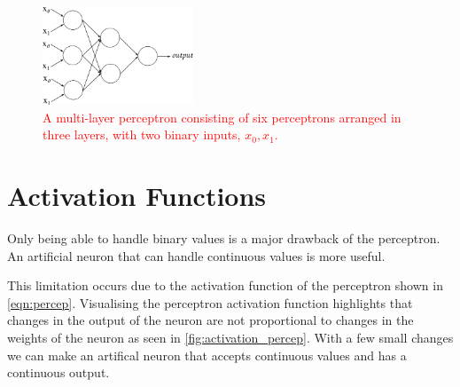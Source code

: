 \begin{figure}[h]
	\centering
	\includegraphics[width=0.4\textwidth]{Figs/intro2dl/mlp.png}
	
	\caption{\textcolor{red}{A multi-layer perceptron consisting of six perceptrons arranged in three layers, with two binary inputs, $x_0, x_1$.}}
	\label{fig:mlp}
\end{figure}

%
%

\section{Activation Functions}

Only being able to handle binary values is a major drawback of the perceptron. An artificial neuron that can handle continuous values is more useful.

This limitation occurs due to the activation function of the perceptron shown in \autoref{eqn:percep}. Visualising the perceptron activation function highlights that changes in the output of the neuron are not proportional to changes in the weights of the neuron as seen in \autoref{fig:activation_percep}. With a few small changes we can make an artifical neuron that accepts continuous values and has a continuous output.

